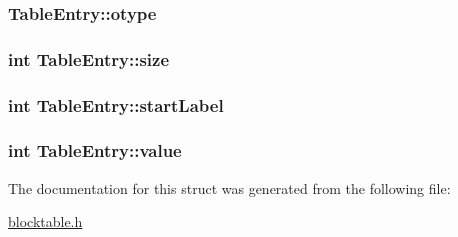 \label{structTableEntry_a74160c41838c43ac2869239d33bea3e0}
\hypertarget{structTableEntry_a14059d82997cf47de6b8a8187cfd154f}{
\subsubsection[{otype}]{ {\bf TableEntry::otype}}}
\label{structTableEntry_a14059d82997cf47de6b8a8187cfd154f}
\hypertarget{structTableEntry_a1ca46ef970e0c34c9d4f6dbfd9424e9f}{
\subsubsection[{size}]{\setlength{\rightskip}{0pt plus 5cm}int {\bf TableEntry::size}}}
\label{structTableEntry_a1ca46ef970e0c34c9d4f6dbfd9424e9f}
\hypertarget{structTableEntry_ac5d597df796d333a3891bf967f64b5e7}{
\subsubsection[{startLabel}]{\setlength{\rightskip}{0pt plus 5cm}int {\bf TableEntry::startLabel}}}
\label{structTableEntry_ac5d597df796d333a3891bf967f64b5e7}
\hypertarget{structTableEntry_ab094106a732ea8edf1c8357489e69b94}{
\subsubsection[{value}]{\setlength{\rightskip}{0pt plus 5cm}int {\bf TableEntry::value}}}
\label{structTableEntry_ab094106a732ea8edf1c8357489e69b94}


The documentation for this struct was generated from the following file:\begin{DoxyCompactItemize}
\item 
\hyperlink{blocktable_8h}{blocktable.h}\end{DoxyCompactItemize}
